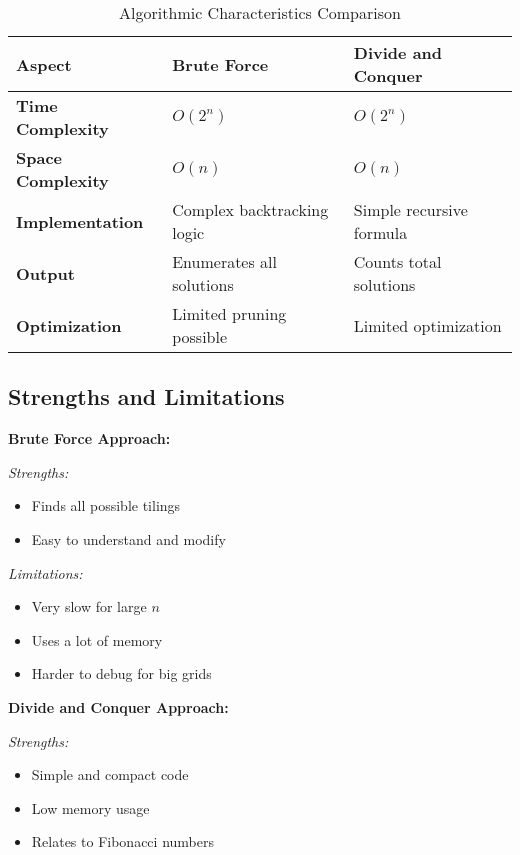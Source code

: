 \documentclass[conference]{IEEEtran}
\begin{document}
\begin{table}[!htbp]
\centering
\caption{Algorithmic Characteristics Comparison}
\label{tab:algorithm_comparison}
\renewcommand{\arraystretch}{1.6}
\begin{tabular}{|p{2.2cm}|p{2cm}|p{2cm}|}
\hline
\textbf{Aspect} & \textbf{Brute Force} & \textbf{Divide and Conquer} \\
\hline
\textbf{Time Complexity} & $O(2^n)$ & $O(2^n)$ \\
\hline
\textbf{Space Complexity} & $O(n)$ & $O(n)$ \\
\hline
\textbf{Implementation} & Complex backtracking logic & Simple recursive formula \\
\hline
\textbf{Output} & Enumerates all solutions & Counts total solutions \\
\hline
\textbf{Optimization} & Limited pruning possible & Limited optimization \\
\hline
\end{tabular}
\end{table}

\subsection{Strengths and Limitations}

\textbf{Brute Force Approach:}

\textit{Strengths:}
\begin{itemize}
    \item Finds all possible tilings
    \item Easy to understand and modify
\end{itemize}

\textit{Limitations:}
\begin{itemize}
    \item Very slow for large $n$
    \item Uses a lot of memory
    \item Harder to debug for big grids
\end{itemize}

\textbf{Divide and Conquer Approach:}

\textit{Strengths:}
\begin{itemize}
    \item Simple and compact code
    \item Low memory usage
    \item Relates to Fibonacci numbers
\end{itemize}
\end{document}
